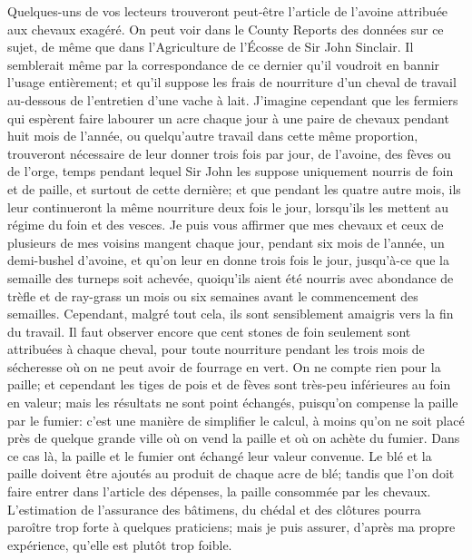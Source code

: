\setcounter{page}{320}Quelques-uns de vos lecteurs trouveront peut-être l'article de l'avoine attribuée aux chevaux exagéré. On peut voir dans le County Reports des données sur ce sujet, de même que dans l'Agriculture de l'Écosse de Sir John Sinclair. Il semblerait même par la correspondance de ce dernier qu'il voudroit en bannir l'usage entièrement; et qu'il suppose les frais de nourriture d'un cheval de travail au-dessous de l'entretien d'une vache à lait. J'imagine cependant que les fermiers qui espèrent faire labourer un acre chaque jour à une paire de chevaux pendant huit mois de l'année, ou quelqu'autre travail dans cette même proportion, trouveront nécessaire de leur donner trois fois par jour, de l'avoine, des fèves ou de l'orge, temps pendant lequel Sir John les suppose uniquement nourris de foin et de paille, et surtout de cette dernière; et que pendant les quatre autre mois, ils leur continueront la même nourriture deux fois le jour, lorsqu'ils les mettent au régime du foin et des vesces.
Je puis vous affirmer que mes chevaux et ceux de plusieurs de mes voisins mangent chaque jour, pendant six mois de l'année, un demi-bushel d'avoine, et qu'on leur en\setcounter{page}{321} donne trois fois le jour, jusqu'à-ce que la semaille des turneps soit achevée, quoiqu'ils aient été nourris avec abondance de trèfle et de ray-grass un mois ou six semaines avant le commencement des semailles. Cependant, malgré tout cela, ils sont sensiblement amaigris vers la fin du travail.
Il faut observer encore que cent stones de foin seulement sont attribuées à chaque cheval, pour toute nourriture pendant les trois mois de sécheresse où on ne peut avoir de fourrage en vert. On ne compte rien pour la paille; et cependant les tiges de pois et de fèves sont très-peu inférieures au foin en valeur; mais les résultats ne sont point échangés, puisqu'on compense la paille par le fumier: c'est une manière de simplifier le calcul, à moins qu'on ne soit placé près de quelque grande ville où on vend la paille et où on achète du fumier. Dans ce cas là, la paille et le fumier ont échangé leur valeur convenue. Le blé et la paille doivent être ajoutés au produit de chaque acre de blé; tandis que l'on doit faire entrer dans l'article des dépenses, la paille consommée par les chevaux.
L'estimation de l'assurance des bâtimens, du chédal et des clôtures pourra paroître\setcounter{page}{322} trop forte à quelques praticiens; mais je puis assurer, d'après ma propre expérience, qu'elle est plutôt trop foible.
